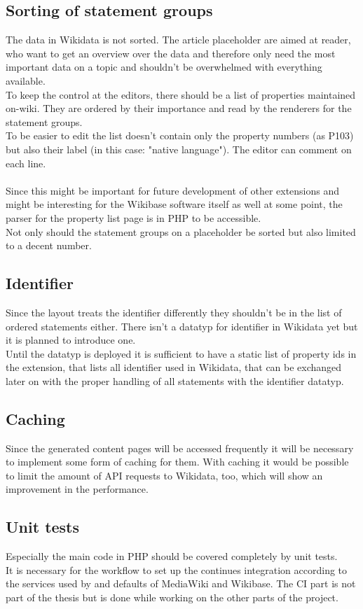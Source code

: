 \documentclass[11pt]{article}
\begin{document}
\subsection{Sorting of statement groups}
The data in Wikidata is not sorted. The article placeholder are aimed at reader, who want to get an overview over the data and therefore only need the most important data on a topic and shouldn't be overwhelmed with everything available. 
\\
To keep the control at the editors, there should be a list of properties maintained on-wiki. They are ordered by their importance and read by the renderers for the statement groups. \\
To be easier to edit the list doesn't contain only the property numbers (as P103) but also their label (in this case: "native language"). The editor can comment on each line. \\
\\
Since this might be important for future development of other extensions and might be interesting for the Wikibase software itself as well at some point, the parser for the property list page is in PHP to be accessible. \\
Not only should the statement groups on a placeholder be sorted but also limited to a decent number.

\subsection {Identifier}
Since the layout treats the identifier differently they shouldn't be in the list of ordered statements either. There isn't a datatyp for identifier in Wikidata yet but it is planned to introduce one. \\
Until the datatyp is deployed it is sufficient to have a static list of property ids in the extension, that lists all identifier used in Wikidata, that can be exchanged later on with the proper handling of all statements with the identifier datatyp.

\subsection{Caching}
Since the generated content pages will be accessed frequently it will be necessary to implement some form of caching for them. With caching it would be possible to limit the amount of API requests to Wikidata, too, which will show an improvement in the performance. 

\subsection {Unit tests}
Especially the main code in PHP should be covered completely by unit tests.\\
It is necessary for the workflow to set up the continues integration according to the services used by and defaults of MediaWiki and Wikibase. The CI part is not part of the thesis but is done while working on the other parts of the project.
\end{document}
